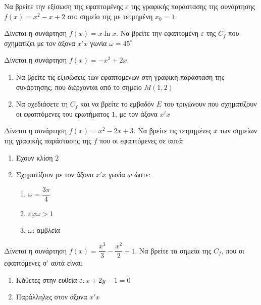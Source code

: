 \documentclass{presentation}
\begin{document}
\begin{askisi}
  Να βρείτε την εξίσωση της εφαπτομένης $ε$ της γραφικής παράστασης της συνάρτησης $f(x)=x^2-x+2$ στο σημείο της με τετμημένη $x_0=1$.

\end{askisi}

\begin{askisi}
  Δίνεται η συνάρτηση $f(x)=x\ln x$. Να βρείτε την εφαπτομένη $ε$ της $C_f$ που σχηματίζει με τον άξονα $x'x$ γωνία $ω=45^{\circ}$

\end{askisi}

\begin{askisi}
  Δίνεται η συνάρτηση $f(x)=-x^2+2x$.
  \begin{enumerate}
    \item<1-> Να βρείτε τις εξισώσεις των εφαπτομένων στη γραφική παράσταση της συνάρτησης, που διέρχονται από το σημείο $Μ(1,2)$
    \item<2-> Να σχεδιάσετε τη $C_f$ και να βρείτε το εμβαδόν $Ε$ του τριγώνουν που σχηματίζουν οι εφαπτόμενες του ερωτήματος $1$, με τον άξονα $x'x$
  \end{enumerate}

\end{askisi}

\begin{askisi}
  Δίνεται η συνάρτηση $f(x)=x^2-2x+3$. Να βρείτε τις τετμημένες $x$ των σημείων της γραφικής παράστασης της $f$ που οι εφαπτόμενες σε αυτά:
  \begin{enumerate}
    \item<1-> Έχουν κλίση $2$
    \item<2-> Σχηματίζουν με τον άξονα $x'x$ γωνία $ω$ ώστε:
          \begin{enumerate}
            \item<2-> $ω=\dfrac{3π}{4}$
            \item<3-> $εφω>1$
            \item<4-> $ω$: αμβλεία
          \end{enumerate}
  \end{enumerate}

\end{askisi}

\begin{askisi}
  Δίνεται η συνάρτηση $f(x)=\dfrac{x^3}{3}-\dfrac{x^2}{2}+1$. Να βρείτε τα σημεία της $C_f$, που οι εφαπτόμενες σ' αυτά είναι:
  \begin{enumerate}
    \item<1-> Κάθετες στην ευθεία $ε:x+2y-1=0$
    \item<2-> Παράλληλες στον άξονα $x'x$
  \end{enumerate}

\end{askisi}
\end{document}
